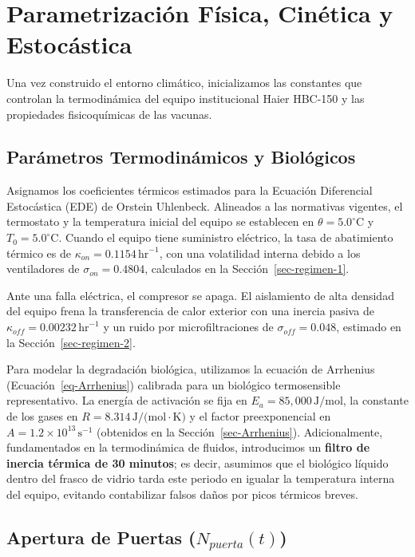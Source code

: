 \documentclass[
  spanish,
  us-letterpaper,
]{scrreprt}
\numberwithin{equation}{section}
\theoremstyle{plain}
\theoremstyle{plain}
\theoremstyle{plain}
\theoremstyle{definition}
\theoremstyle{remark}
\begin{document}
\section{Parametrización Física, Cinética y
Estocástica}\label{sec-parametrizacion-fisica}

Una vez construido el entorno climático, inicializamos las constantes
que controlan la termodinámica del equipo institucional Haier HBC-150 y
las propiedades fisicoquímicas de las vacunas.

\subsection{Parámetros Termodinámicos y
Biológicos}\label{sec-params-termo}

Asignamos los coeficientes térmicos estimados para la Ecuación
Diferencial Estocástica (EDE) de Orstein Uhlenbeck. Alineados a las
normativas vigentes, el termostato y la temperatura inicial del equipo
se establecen en \(\theta = 5.0^\circ\text{C}\) y
\(T_0 = 5.0^\circ\text{C}\). Cuando el equipo tiene suministro
eléctrico, la tasa de abatimiento térmico es de
\(\kappa_{on} = 0.1154\,\text{hr}^{-1}\), con una volatilidad interna
debido a los ventiladores de \(\sigma_{on} = 0.4804\), calculados en la
Sección~\ref{sec-regimen-1}.

Ante una falla eléctrica, el compresor se apaga. El aislamiento de alta
densidad del equipo frena la transferencia de calor exterior con una
inercia pasiva de \(\kappa_{off} = 0.00232\,\text{hr}^{-1}\) y un ruido
por microfiltraciones de \(\sigma_{off} = 0.048\), estimado en la
Sección~\ref{sec-regimen-2}.

Para modelar la degradación biológica, utilizamos la ecuación de
Arrhenius (Ecuación~\ref{eq-Arrhenius}) calibrada para un biológico
termosensible representativo. La energía de activación se fija en
\(E_a = 85,000\,\text{J/mol}\), la constante de los gases en
\(R = 8.314\,\text{J/(mol}\cdot\text{K)}\) y el factor preexponencial en
\(A = 1.2 \times 10^{13} \, \text{s}^{-1}\) (obtenidos en la
Sección~\ref{sec-Arrhenius}). Adicionalmente, fundamentados en la
termodinámica de fluidos, introducimos un \textbf{filtro de inercia
térmica de 30 minutos}; es decir, asumimos que el biológico líquido
dentro del frasco de vidrio tarda este periodo en igualar la temperatura
interna del equipo, evitando contabilizar falsos daños por picos
térmicos breves.

\subsection{\texorpdfstring{Apertura de Puertas
(\(N_{puerta}(t)\))}{Apertura de Puertas (N\_\{puerta\}(t))}}\label{sec-aperturas-puerta}
\end{document}
